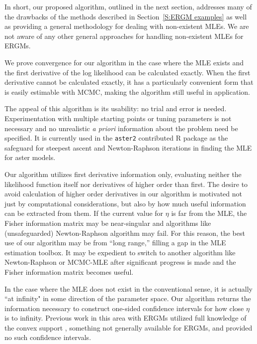 In short, our proposed algorithm, outlined in the next section,
 addresses many of the drawbacks of the methods
described in Section~\ref{S:ERGM examples} as well as providing a general methodology
for dealing with non-existent MLEs.  We are not aware of any other 
general approaches for handling non-existent MLEs for ERGMs.  

We prove convergence for our algorithm in the case where the MLE exists and the first 
derivative of the log likelihood can be calculated exactly.
When the first derivative cannot be calculated exactly, 
it has a particularly convenient form that is 
easily estimable with MCMC, making the algorithm still useful in application.

The appeal of this algorithm is its usability: no trial and error is needed.  
Experimentation with multiple starting points or tuning parameters is not necessary 
and no unrealistic \emph{a priori} information about the problem need be specified.  
It is currently used in the \texttt{aster2} contributed R package 
\citep{aster:R} as the safeguard for steepest ascent and Newton-Raphson
 iterations in finding the MLE for aster models.

Our algorithm utilizes first derivative information only, evaluating 
neither the likelihood function itself nor derivatives of higher order than first.
The desire to avoid calculation of higher order derivatives in our algorithm
is motivated not just by 
computational considerations, but 
also by how much useful information can be extracted from them.   
If the current value for $\eta$ is far from the MLE,  
the Fisher information matrix may be near-singular and algorithms like (unsafeguarded) 
Newton-Raphson algorithm may fail.  
For this 
reason, the best use of our algorithm may be from ``long range,'' filling a gap in the MLE estimation toolbox.  It may 
be expedient to switch to another algorithm like Newton-Raphson or MCMC-MLE 
after significant progress is made and the Fisher information matrix becomes useful.  

In the case where the MLE does not exist in the conventional sense, 
it is actually ``at infinity" in some direction of the parameter space.
Our algorithm returns the information necessary to construct one-sided confidence 
intervals for how close $\eta$ is to infinity.  
Previous work in this area with ERGMs utilized full knowledge
of the convex support \citep{Handcock:degeneracy,Rinaldo:2009}, something
not generally available for ERGMs, and provided no such confidence intervals.


